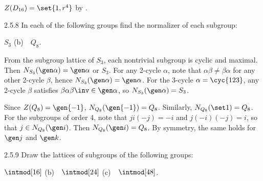 \begin{sol}
    $Z(D_{16}) = \set{1, r^4}$ by .
\end{sol}

\begin{exercise}{2.5.8}
    In each of the following groups find the normalizer of each subgroup:
    \begin{subexercises}
        \item $S_3$ \quad (b)~~$Q_8$.
    \end{subexercises}
\end{exercise}

\begin{solenum}
    \item From the subgroup lattice of $S_3$, each nontrivial subgroup is cyclic and maximal.
	Then $N_{S_3}(\gen\alpha) = \gen\alpha$ or $S_3$.
	For any 2-cycle $\alpha$, note that $\alpha\beta \neq \beta\alpha$ for any other 2-cycle $\beta$, hence $N_{S_3}(\gen\alpha) = \gen\alpha$.
	For the 3-cycle $\alpha = \cyc{1 2 3}$, any 2-cycle $\beta$ satisfies $\beta\alpha\beta\inv \in \gen\alpha$, so $N_{S_3}(\gen\alpha) = S_3$.
    \item Since $Z(Q_8) = \gen{-1}$, $N_{Q_8}(\gen{-1}) = Q_8$.
	Similarly, $N_{Q_8}(\set 1) = Q_8$.
	For the subgroups of order 4, note that $ji(-j) = -i$ and $j(-i)(-j) = i$, so that $j \in N_{Q_8}(\gen i)$.
	Then $N_{Q_8}(\gen i) = Q_8$.
	By symmetry, the same holds for $\gen j$ and $\gen k$.
\end{solenum}

\begin{exercise}{2.5.9}
    Draw the lattices of subgroups of the following groups:
    \begin{subexercises}
        \item $\intmod[16]$ \quad (b)~~$\intmod[24]$ \quad (c)~~$\intmod[48]$.
    \end{subexercises}
\end{exercise}

